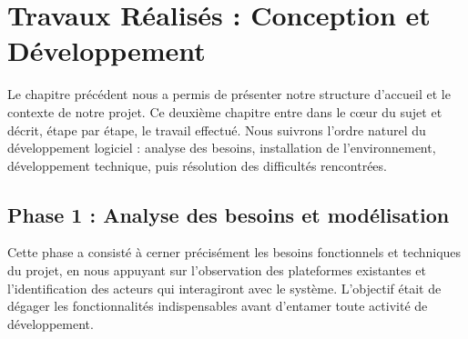 
\chapter{Travaux R\'ealis\'es : Conception et D\'eveloppement}
\label{chap:travaux_realises}
\vspace{-4pt}
Le chapitre pr\'ec\'edent nous a permis de pr\'esenter notre structure d'accueil et le contexte de notre projet. Ce deuxi\`eme chapitre entre dans le c\oe ur du sujet et d\'ecrit, \'etape par \'etape, le travail effectu\'e. Nous suivrons l'ordre naturel du d\'eveloppement logiciel : analyse des besoins, installation de l'environnement, d\'eveloppement technique, puis r\'esolution des difficult\'es rencontr\'ees.
\section{Phase 1 : Analyse des besoins et mod\'elisation}
\vspace{-2pt}
Cette phase a consist\'e \`a cerner pr\'ecis\'ement les besoins fonctionnels et techniques du projet, en nous appuyant sur l'observation des plateformes existantes et l'identification des acteurs qui interagiront avec le syst\`eme. L'objectif \'etait de d\'egager les fonctionnalit\'es indispensables avant d'entamer toute activit\'e de d\'eveloppement.
